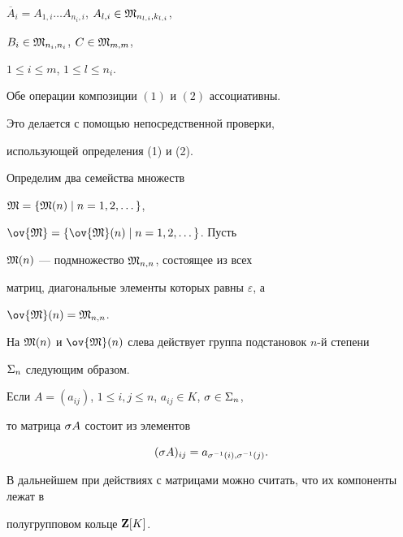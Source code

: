 $\overline{A}_i=A_{1,i}\dotsc A_{n_i,i}$, $A_{l,i}\in {\frak M}_{n_{l,i},k_{l,i}}$,


$B_i\in {\frak M}_{n_i,n_i}$, $C\in {\frak M}_{m,m}$,


$1\leq i\leq m$, $ 1\leq l\leq n_i$.








\begin{lem}


Обе операции композиции $(1)$ и $(2)$ ассоциативны.


\end{lem}





\begin{pf}


Это делается с помощью непосредственной проверки,


использующей определения (1) и (2).


\end{pf}








Определим два семейства множеств


${\frak M}=\{ {\frak M}(n) \mid n=1,2, \dotsc \}$,


$\ov{\M}=\{ \ov{\M}(n) \mid n=1,2, \dotsc \}$. Пусть


${\frak M}(n)$ --- подмножество ${\frak M}_{n,n}$, состоящее из всех


матриц, диагональные элементы которых равны $\varepsilon$, а


$\ov{\M}(n)=\M_{n,n}$.


На ${\frak M}(n)$ и $\ov{\M}(n)$ слева действует группа подстановок $n$-й степени


$\Sigma_n$ следующим образом.


Если $A=(a_{ij})$, $1\leq i,j\leq n$, $a_{ij}\in K$, $\sigma\in \Sigma_n$,


то матрица $\sigma A$ состоит из элементов


\begin{equation}


(\s A)_{ij}=a_{\s^{-1}(i),\s^{-1}(j)}.


\end{equation}


В дальнейшем при действиях с матрицами можно считать, что их компоненты лежат в 


полугрупповом кольце ${\bold Z}[K]$.









